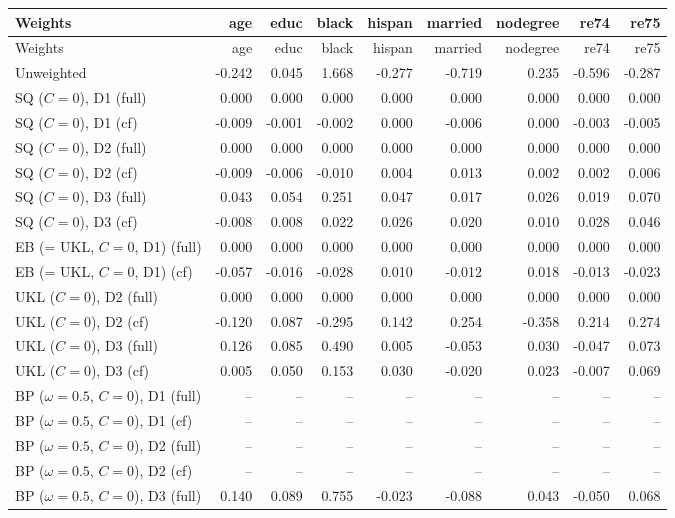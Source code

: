 \begin{tabular}{lrrrrrrrr}
\hline
Weights & age & educ & black & hispan & married & nodegree & re74 & re75 \\
\hline
\endfirsthead
\hline
Weights & age & educ & black & hispan & married & nodegree & re74 & re75 \\
\hline
\endhead
Unweighted & -0.242 & 0.045 & 1.668 & -0.277 & -0.719 & 0.235 & -0.596 & -0.287 \\
SQ ($C=0$), D1 (full) & 0.000 & 0.000 & 0.000 & 0.000 & 0.000 & 0.000 & 0.000 & 0.000 \\
SQ ($C=0$), D1 (cf) & -0.009 & -0.001 & -0.002 & 0.000 & -0.006 & 0.000 & -0.003 & -0.005 \\
SQ ($C=0$), D2 (full) & 0.000 & 0.000 & 0.000 & 0.000 & 0.000 & 0.000 & 0.000 & 0.000 \\
SQ ($C=0$), D2 (cf) & -0.009 & -0.006 & -0.010 & 0.004 & 0.013 & 0.002 & 0.002 & 0.006 \\
SQ ($C=0$), D3 (full) & 0.043 & 0.054 & 0.251 & 0.047 & 0.017 & 0.026 & 0.019 & 0.070 \\
SQ ($C=0$), D3 (cf) & -0.008 & 0.008 & 0.022 & 0.026 & 0.020 & 0.010 & 0.028 & 0.046 \\
EB (= UKL, $C=0$, D1) (full) & 0.000 & 0.000 & 0.000 & 0.000 & 0.000 & 0.000 & 0.000 & 0.000 \\
EB (= UKL, $C=0$, D1) (cf) & -0.057 & -0.016 & -0.028 & 0.010 & -0.012 & 0.018 & -0.013 & -0.023 \\
UKL ($C=0$), D2 (full) & 0.000 & 0.000 & 0.000 & 0.000 & 0.000 & 0.000 & 0.000 & 0.000 \\
UKL ($C=0$), D2 (cf) & -0.120 & 0.087 & -0.295 & 0.142 & 0.254 & -0.358 & 0.214 & 0.274 \\
UKL ($C=0$), D3 (full) & 0.126 & 0.085 & 0.490 & 0.005 & -0.053 & 0.030 & -0.047 & 0.073 \\
UKL ($C=0$), D3 (cf) & 0.005 & 0.050 & 0.153 & 0.030 & -0.020 & 0.023 & -0.007 & 0.069 \\
BP ($\omega=0.5$, $C=0$), D1 (full) & -- & -- & -- & -- & -- & -- & -- & -- \\
BP ($\omega=0.5$, $C=0$), D1 (cf) & -- & -- & -- & -- & -- & -- & -- & -- \\
BP ($\omega=0.5$, $C=0$), D2 (full) & -- & -- & -- & -- & -- & -- & -- & -- \\
BP ($\omega=0.5$, $C=0$), D2 (cf) & -- & -- & -- & -- & -- & -- & -- & -- \\
BP ($\omega=0.5$, $C=0$), D3 (full) & 0.140 & 0.089 & 0.755 & -0.023 & -0.088 & 0.043 & -0.050 & 0.068 \\

\end{tabular}

